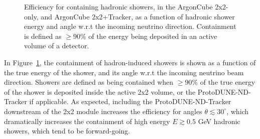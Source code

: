 \begin{figure}[htb]
  \centering
  \caption{Efficiency for containing hadronic showers, in the ArgonCube 2x2-only, and ArgonCube 2x2+Tracker, as a function of hadronic shower energy and angle w.r.t the incoming neutrino direction. Containment is defined as $\geq$90\% of the energy being deposited in an active volume of a detector.}
  \label{fig:hadronic_containment}
\end{figure}
In Figure~\ref{fig:hadronic_containment}, the containment of hadron-induced showers is shown as a function of the true energy of the shower, and its angle w.r.t the incoming neutrino beam direction. Showers are defined as being contained when $\geq$90\% of the true energy of the shower is deposited inside the active 2x2 volume, or the ProtoDUNE-ND-Tracker if applicable. As expected, including the ProtoDUNE-ND-Tracker downstream of the 2x2 module increases the efficiency for angles $\theta \lesssim 30^{\circ}$, which dramatically increases the containment of high energy $E \gtrsim 0.5$ GeV hadronic showers, which tend to be forward-going.

